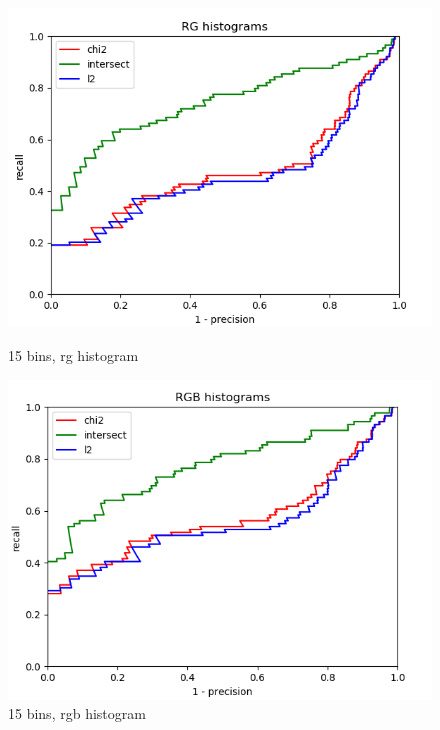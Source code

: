 \documentclass{article}
\begin{document}
\begin{figure}[ht]
    \centering
    \begin{minipage}{.5\textwidth}
        \includegraphics[width=\linewidth]{images/Q4.b-rg_histogram_15_bins.png}
        \caption{15 bins, rg histogram}
    \end{minipage}\hfill
    \begin{minipage}{.5\textwidth}
        \includegraphics[width=\linewidth]{images/Q4.b-rgb_histogram_15_bins.png}
        \caption{15 bins, rgb histogram}
    \end{minipage}
    \begin{minipage}{.5\textwidth}

\end{minipage}
\end{figure}
\end{document}
